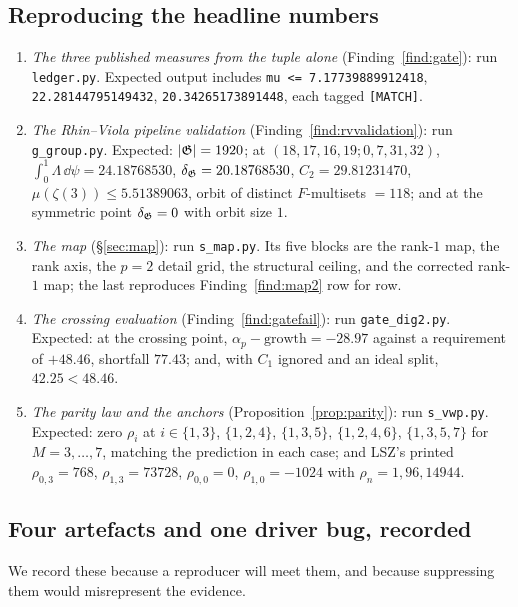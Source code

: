 \subsection{Reproducing the headline numbers}\label{ss:reprohead}

\begin{enumerate}[label=\textup{(\arabic*)},leftmargin=2.6em,itemsep=4pt]
\item \emph{The three published measures from the tuple alone} (Finding~\ref{find:gate}):
      run \texttt{ledger.py}. Expected output includes
      \texttt{mu <= 7.17739889912418}, \texttt{22.28144795149432},
      \texttt{20.34265173891448}, each tagged \texttt{[MATCH]}.
\item \emph{The Rhin--Viola pipeline validation} (Finding~\ref{find:rvvalidation}): run
      \texttt{g\_group.py}. Expected: $|\mathfrak{G}|=1920$; at $(18,17,16,19;0,7,31,32)$,
      $\int_0^1\Lambda\,\dd\psi=24.18768530$, $\delta_{\mathfrak{G}}=20.18768530$, $C_2=29.81231470$,
      $\mu(\zeta(3))\le5.51389063$, orbit of distinct $F$-multisets $=118$; and at the
      symmetric point $\delta_{\mathfrak{G}}=0$ with orbit size $1$.
\item \emph{The map} (\S\ref{sec:map}): run \texttt{s\_map.py}. Its five blocks are the
      rank-$1$ map, the rank axis, the $p=2$ detail grid, the structural ceiling, and the
      corrected rank-$1$ map; the last reproduces Finding~\ref{find:map2} row for row.
\item \emph{The crossing evaluation} (Finding~\ref{find:gatefail}): run
      \texttt{gate\_dig2.py}. Expected: at the crossing point,
      $\alpha_p-\mathrm{growth}=-28.97$ against a requirement of $+48.46$, shortfall
      $77.43$; and, with $C_1$ ignored and an ideal split, $42.25<48.46$.
\item \emph{The parity law and the anchors} (Proposition~\ref{prop:parity}): run
      \texttt{s\_vwp.py}. Expected: zero $\rho_i$ at $i\in\{1,3\}$, $\{1,2,4\}$,
      $\{1,3,5\}$, $\{1,2,4,6\}$, $\{1,3,5,7\}$ for $M=3,\dots,7$, matching the prediction
      in each case; and LSZ's printed $\rho_{0,3}=768$, $\rho_{1,3}=73728$,
      $\rho_{0,0}=0$, $\rho_{1,0}=-1024$ with $\rho_n=1,96,14944$.
\end{enumerate}

\subsection{Four artefacts and one driver bug, recorded}\label{ss:artefacts}

We record these because a reproducer will meet them, and because suppressing them would
misrepresent the evidence.


